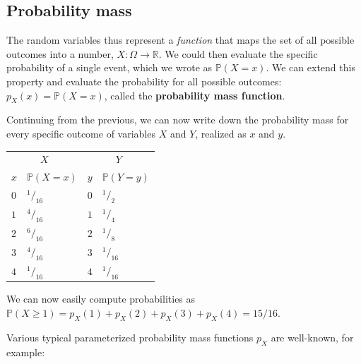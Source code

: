 \documentclass{article}
\begin{document}
\subsection{Probability mass}
The random variables thus represent a \textit{function} that maps the set of all possible outcomes into a number, $X:\Omega\to\mathbb{R}$. We could then evaluate the specific probability of a single event, which we wrote as $\mathbb{P}(X=x)$. We can extend this property and evaluate the probability for all possible outcomes: $p_X(x)=\mathbb{P}(X=x)$, called the \textbf{probability mass function}.
\begin{testexample}
Continuing from the previous, we can now write down the probability mass for every specific outcome of variables $X$ and $Y$, realized as $x$ and $y$.
\begin{center}
    \begin{tabular}{@{}ll|ll}
\toprule
\multicolumn{2}{c|}{$X$} & \multicolumn{2}{c}{$Y$}\\
$x$ & $\mathbb{P}(X=x)$ & $y$ &$\mathbb{P}(Y=y)$ \\ \hline
$0$ & $^{1\!}/_{\!16}$ & $0$ & $^{1\!}/_{\!2}$ \\
$1$ & $^{4\!}/_{\!16}$ & $1$ & $^{1\!}/_{\!4}$ \\
$2$ & $^{6\!}/_{\!16}$ & $2$ & $^{1\!}/_{\!8}$ \\
$3$ & $^{4\!}/_{\!16}$ & $3$ & $^{1\!}/_{\!16}$ \\
$4$ & $^{1\!}/_{\!16}$ & $4$ & $^{1\!}/_{\!16}$ \\\bottomrule
\end{tabular}
\end{center}
We can now easily compute probabilities as $\mathbb{P}(X\geq 1)=p_X(1)+p_X(2)+p_X(3)+p_X(4)=15/16$.
\end{testexample}
{\flushleft Various} typical parameterized probability mass functions $p_X$ are well-known, for example:
\end{document}
